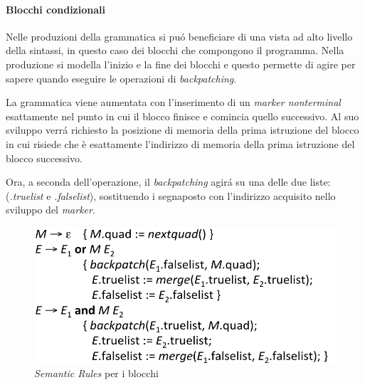 \paragraph{Blocchi condizionali}
Nelle produzioni della grammatica si pu\'o beneficiare di una vista ad alto
livello della sintassi, in questo caso dei blocchi che compongono il programma.
Nella produzione si modella l'inizio e la fine dei blocchi e questo permette di
agire per sapere quando eseguire le operazioni di \textit{backpatching}.

La grammatica viene aumentata con l'inserimento di un
\textit{marker nonterminal} esattamente nel punto in cui il blocco finisce e
comincia quello successivo. Al suo sviluppo verr\'a richiesto la posizione di
memoria della prima istruzione del blocco in cui risiede che \`e esattamente
l'indirizzo di memoria della prima istruzione del blocco successivo.

Ora, a seconda dell'operazione, il \textit{backpatching} agir\'a su una delle
due liste: (\textit{.truelist} e \textit{.falselist}), sostituendo i segnaposto
con l'indirizzo acquisito nello sviluppo del \textit{marker}.

\begin{figure}[H]
  \centering
  \includegraphics[scale=0.5]{res/image/block_backpatching}
  \caption{\textit{Semantic Rules} per i blocchi}
  \label{img:block_backpatching}
\end{figure}
